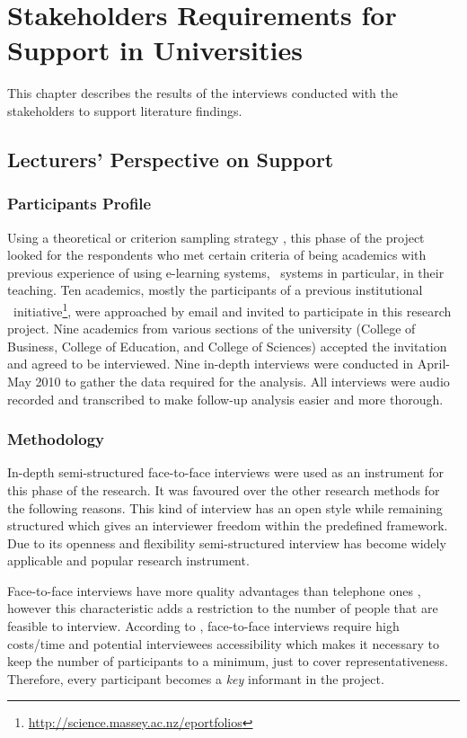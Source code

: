 \chapter{Stakeholders Requirements for \LLLc Support in Universities
\label{cha:model}}

This chapter describes the results of the interviews conducted with the
stakeholders to support literature findings.


\section{Lecturers' Perspective on \LLLc Support}
\subsection{Participants Profile}
Using a theoretical or criterion sampling strategy \citep{Byrne2001,
Warren2001}, this phase of the project looked for the respondents who met
certain criteria of being academics with previous experience of using
e-learning systems, \ep~systems in particular, in their teaching. Ten academics,
mostly the participants of a previous institutional
\ep~initiative\footnote{\url{http://science.massey.ac.nz/eportfolios}}, were
approached by email and invited to participate in this research project. Nine
academics from various sections of the university (College of Business, College
of Education, and College of Sciences) accepted the invitation and agreed to be
interviewed. Nine in-depth interviews were conducted in April-May 2010 to gather
the data required for the analysis. All interviews were audio recorded and
transcribed to make follow-up analysis easier and more thorough.

\subsection{Methodology}

In-depth semi-structured face-to-face interviews were used as an instrument for
this phase of the research. It was favoured over the other research methods for
the following reasons. This kind of interview has an open style while remaining
structured \citep{Gillham2000} which gives an interviewer freedom within the
predefined framework. Due to its openness and flexibility semi-structured
interview has become widely applicable and popular research instrument.

Face-to-face interviews have more quality advantages than telephone ones
\citep{Shuy2001}, however this characteristic adds a restriction to the number
of people that are feasible to interview. According to \citet{Gillham2000},
face-to-face interviews require high costs/time and potential interviewees
accessibility which makes it necessary to keep the number of participants to a
minimum, just to cover representativeness. Therefore, every participant becomes
a \textit{key} informant in the project.

